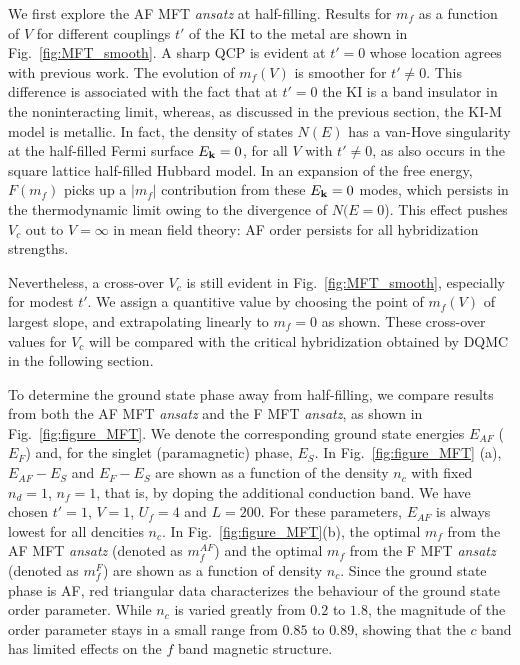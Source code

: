 \documentclass[pra,letterpaper,10pt,twocolumn]{revtex4}
\begin{document}
We first explore the AF MFT {\it ansatz} at half-filling. 
Results for $m_f$ as a function of $V$ for different
couplings $t'$ of the KI to the metal are shown in 
Fig.~\ref{fig:MFT_smooth}.
A sharp QCP is evident at $t'=0$ whose location agrees with previous
work\cite{Vekic95}.  The evolution of $m_f(V)$ is smoother
for $t' \neq 0$.  This difference is associated with the  fact that
at $t'=0$ the KI is a band insulator in the noninteracting limit,
whereas, as discussed in the previous section, the KI-M
model is metallic.  In fact, the density of states $N(E)$ has
a van-Hove singularity at the half-filled Fermi
surface $E_{\bf k}=0$, for all $V$ with $t' \neq 0$, as also
occurs in the square lattice half-filled Hubbard model. 
In an expansion of the free energy, 
$F(m_f)$ picks up
a $|m_f|$ contribution from these $E_{\bf k}=0$ modes,
which persists in the thermodynamic limit owing to 
the divergence of $N(E=0$).
This effect
pushes $V_c$ out to $V=\infty$ in mean field theory:
AF order persists for all hybridization strengths.

Nevertheless, a cross-over $V_c$ is still evident in 
Fig.~\ref{fig:MFT_smooth}, especially for modest $t'$.
We assign a quantitive value by choosing the point of 
$m_f(V)$ of largest slope, and extrapolating linearly to
$m_f=0$ as shown.  These cross-over values for $V_c$ will be compared
with the critical hybridization obtained by DQMC in the 
following section.

To determine the ground state phase away from half-filling, we compare
results from both the AF MFT {\it ansatz} and the F MFT {\it ansatz}, as
shown in Fig.~\ref{fig:figure_MFT}. We denote the corresponding
ground state energies
$E_{AF}$ ($E_{F}$) and, for the singlet (paramagnetic) phase,
$E_{S}$. In
Fig.~\ref{fig:figure_MFT} (a), $E_{AF}-E_{S}$ and $E_{F}-E_{S}$ are
shown as a function of the density $n_c$ with fixed $n_d=1$, $n_f=1$,
that is, by doping the additional conduction band.  We have chosen
$t'=1$, $V=1$, $U_f=4$ and $L=200$.  For these
parameters, $E_{AF}$ is always lowest for all dencities $n_c$.
In Fig.~\ref{fig:figure_MFT}(b), the optimal $m_f$ from
the AF MFT {\it ansatz} (denoted as $m^{AF}_f$) and the optimal $m_f$
from the F MFT {\it ansatz} (denoted as $m^{F}_f$) are shown as a
function of density $n_c$.
Since the ground state phase is AF, red
triangular data characterizes the behaviour of the ground state order
parameter. While $n_c$ is varied greatly from $0.2$ to $1.8$, the
magnitude of the order parameter stays in a small range from $0.85$ to
$0.89$, showing that the $c$ band has limited effects on the $f$ band
magnetic structure. 
\end{document}
